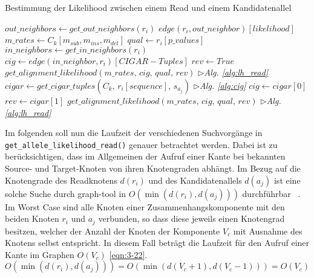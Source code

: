 \renewcommand{\algorithmiccomment}[1]{\hfill$\triangleright$\textit{#1}}
\begin{algorithm}[H]
	\caption{Bestimmung der Likelihood zwischen einem Read und einem Kandidatenallel} \label{alg:r-a-lh}
	\begin{algorithmic}[1]	
		\State $ out\_neighbors \gets get\_out\_neighbors(r_{i})$
		\State \Return $ edge(r_{i}, out\_neighbor)[likelihood]$
		\EndIf
		\EndFor
		\State $ m\_{rates} \gets C_{k}[m_{sub},m_{ins},m_{del}] $
		\State $ qual \gets r_{i}[p\_values] $
		\State $ in\_neighbors \gets get\_in\_neighbors(r_{i})$		
		\State $ cig \gets edge(in\_neighbor, r_{i})[CIGAR-Tuples]$		
		\State $ rev \gets True $
		\State \Return $get\_alignment\_likelihood(m\_{rates},\, cig,\, qual,\, rev)$   \algorithmiccomment{Alg. \ref{alg:lh_read}}
		\EndIf		
		\EndFor
		\State $ cigar \gets get\_cigar\_tuples(C_{k},\, r_{i}[sequence],\, s_{a_{j}}) $ \algorithmiccomment{Alg. \ref{alg:cig}}		
		\State $ cig \gets cigar[0]$
		\State $ rev \gets cigar[1]$
		\State \Return $get\_alignment\_likelihood(m\_{rates},\, cig,\, qual,\, rev)$   \algorithmiccomment{Alg. \ref{alg:lh_read}}
		\EndIf
		\State {}
		\EndFunction
	\end{algorithmic}
\end{algorithm}

Im folgenden soll nun die Laufzeit der verschiedenen Suchvorgänge in \linebreak \lstinline|get_allele_likelihood_read()| genauer betrachtet werden. Dabei ist zu berücksichtigen, dass im Allgemeinen der Aufruf einer Kante bei bekannten Source- und Target-Knoten von ihren Knotengraden abhängt. Im Bezug auf die Knotengrade des Readknotens $d(r_{i}) $  und des Kandidatenallels $d(a_{j}) $ ist eine solche Suche durch graph-tool in $O(\min (d(r_{i}), d(a_{j})))$ durchführbar ~\cite{docs_graph_tool}. Im Worst Case sind alle Knoten einer Zusammenhangskomponente mit den beiden Knoten $r_{i}$ und $a_{j}$ verbunden, so dass diese jeweils einen Knotengrad besitzen, welcher der Anzahl der Knoten der Komponente $V_{c}$ mit Ausnahme des Knotens selbst entspricht. In diesem Fall beträgt die Laufzeit für den Aufruf einer Kante im Graphen $ O(V_{c}) $ \eqref{eqn:3-22}.
\begin{equation} \label{eqn:3-22}
\tag{3-22}
O(\min (d(r_{i}), d(a_{j}))) =O(\min (d(V_{c}+1), d(V_{c}-1)))= O(V_{c})
\end{equation} 

